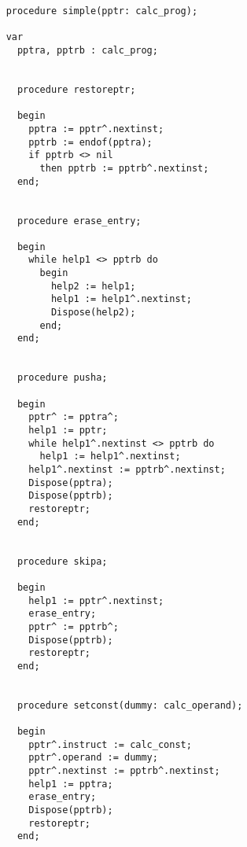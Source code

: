 \begin{refsection}
\begin{lstlisting}
    procedure simple(pptr: calc_prog);

    var
      pptra, pptrb : calc_prog;


      procedure restoreptr;

      begin
        pptra := pptr^.nextinst;
        pptrb := endof(pptra);
        if pptrb <> nil
          then pptrb := pptrb^.nextinst;
      end;


      procedure erase_entry;

      begin
        while help1 <> pptrb do
          begin
            help2 := help1;
            help1 := help1^.nextinst;
            Dispose(help2);
          end;
      end;


      procedure pusha;

      begin
        pptr^ := pptra^;
        help1 := pptr;
        while help1^.nextinst <> pptrb do
          help1 := help1^.nextinst;
        help1^.nextinst := pptrb^.nextinst;
        Dispose(pptra);
        Dispose(pptrb);
        restoreptr;
      end;


      procedure skipa;

      begin
        help1 := pptr^.nextinst;
        erase_entry;
        pptr^ := pptrb^;
        Dispose(pptrb);
        restoreptr;
      end;


      procedure setconst(dummy: calc_operand);

      begin
        pptr^.instruct := calc_const;
        pptr^.operand := dummy;
        pptr^.nextinst := pptrb^.nextinst;
        help1 := pptra;
        erase_entry;
        Dispose(pptrb);
        restoreptr;
      end;


\end{lstlisting}
\end{refsection}
